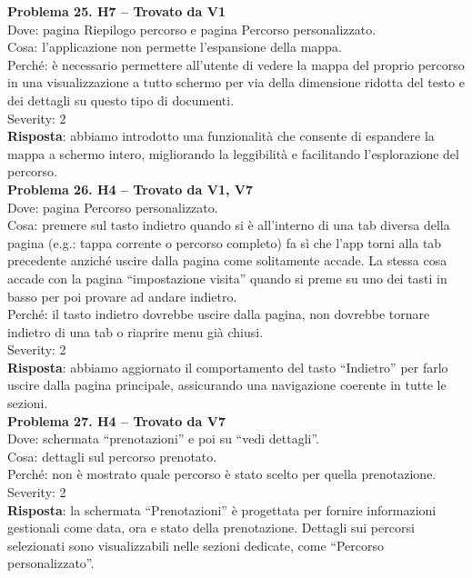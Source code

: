 \documentclass{article}
\begin{document}
\noindent \textbf{Problema 25. H7 – Trovato da V1} \\
Dove: pagina Riepilogo percorso e pagina Percorso personalizzato. \\
Cosa: l’applicazione non permette l’espansione della mappa. \\
Perché: è necessario permettere all’utente di vedere la mappa del proprio percorso in una visualizzazione a tutto schermo per via della dimensione ridotta del testo e dei dettagli su questo tipo di documenti. \\
Severity: 2 \\
\textbf{Risposta}: abbiamo introdotto una funzionalità che consente di espandere la mappa a schermo intero, migliorando la leggibilità e facilitando l’esplorazione del percorso.\\

\noindent \textbf{Problema 26. H4 – Trovato da V1, V7} \\
Dove: pagina Percorso personalizzato. \\
Cosa: premere sul tasto indietro quando si è all’interno di una tab diversa della pagina (e.g.: tappa corrente o percorso completo) fa sì che l’app torni alla tab precedente anziché uscire dalla pagina come solitamente accade. La stessa cosa accade con la pagina “impostazione visita” quando si preme su uno dei tasti in basso per poi provare ad andare indietro. \\
Perché: il tasto indietro dovrebbe uscire dalla pagina, non dovrebbe tornare indietro di una tab o riaprire menu già chiusi. \\
Severity: 2 \\
\textbf{Risposta}: abbiamo aggiornato il comportamento del tasto “Indietro” per farlo uscire dalla pagina principale, assicurando una navigazione coerente in tutte le sezioni.\\

\noindent \textbf{Problema 27. H4 – Trovato da V7} \\
Dove: schermata “prenotazioni” e poi su “vedi dettagli”. \\
Cosa: dettagli sul percorso prenotato. \\
Perché: non è mostrato quale percorso è stato scelto per quella prenotazione. \\
Severity: 2 \\
\textbf{Risposta}: la schermata “Prenotazioni” è progettata per fornire informazioni gestionali come data, ora e stato della prenotazione. Dettagli sui percorsi selezionati sono visualizzabili nelle sezioni dedicate, come “Percorso personalizzato”.\\
\end{document}
